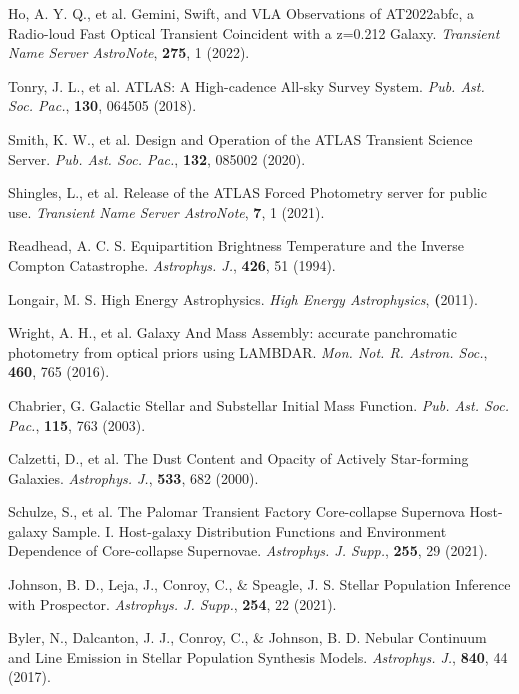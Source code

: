 \documentclass{nature_plusfigure}
\newcommand{\mn}{{Mon. Not. R. Astron. Soc.}}
\newcommand{\mnras}{\mn}
\newcommand{\apj}{{Astrophys. J.}}
\newcommand{\apjs}{{Astrophys. J. Supp.}}
\newcommand{\pasp}{{Pub. Ast. Soc. Pac.}}
\begin{document}
\begin{methods}
\begin{thebibliography}{10}

 Ho, A. Y. Q., et al. Gemini, Swift, and VLA Observations of AT2022abfc, a Radio-loud Fast Optical Transient Coincident with a z=0.212 Galaxy. \emph{Transient Name Server AstroNote}, \textbf{275}, 1 (2022). 

  Tonry, J. L., et al. ATLAS: A High-cadence All-sky Survey System. \emph{\pasp}, \textbf{130}, 064505 (2018). 

 Smith, K. W., et al. Design and Operation of the ATLAS Transient Science Server. \emph{\pasp}, \textbf{132}, 085002 (2020). 

 Shingles, L., et al. Release of the ATLAS Forced Photometry server for public use. \emph{Transient Name Server AstroNote}, \textbf{7}, 1 (2021). 

 Readhead, A. C. S. Equipartition Brightness Temperature and the Inverse Compton Catastrophe. \emph{\apj}, \textbf{426}, 51 (1994). 

  Longair, M. S. High Energy Astrophysics. \emph{High Energy Astrophysics}, \textbf (2011). 
 
 
  Wright, A. H., et al. Galaxy And Mass Assembly: accurate panchromatic photometry from optical priors using LAMBDAR. \emph{\mnras}, \textbf{460}, 765 (2016). 
 
   Chabrier, G. Galactic Stellar and Substellar Initial Mass Function. \emph{\pasp}, \textbf{115}, 763 (2003). 

 Calzetti, D., et al. The Dust Content and Opacity of Actively Star-forming Galaxies. \emph{\apj}, \textbf{533}, 682 (2000). 

 Schulze, S., et al. The Palomar Transient Factory Core-collapse Supernova Host-galaxy Sample. I. Host-galaxy Distribution Functions and Environment Dependence of Core-collapse Supernovae. \emph{\apjs}, \textbf{255}, 29 (2021). 

  Johnson, B. D., Leja, J., Conroy, C., \& Speagle, J. S. Stellar Population Inference with Prospector. \emph{\apjs}, \textbf{254}, 22 (2021). 
 
  Byler, N., Dalcanton, J. J., Conroy, C., \& Johnson, B. D. Nebular Continuum and Line Emission in Stellar Population Synthesis Models. \emph{\apj}, \textbf{840}, 44 (2017). 
 

\end{thebibliography}
\end{methods}
\end{document}

